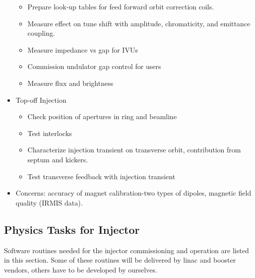 \documentclass[letterpaper,showtrims]{memoir}
\begin{document}
\begin{itemize}
\begin{itemize}
  \item Prepare look-up tables for feed forward orbit correction coils.
  \item Measure effect on tune shift with amplitude, chromaticity, and emittance coupling.
  \item Measure impedance vs gap for IVUs
  \item Commission undulator gap control for users
  \item Measure flux and brightness
  \end{itemize}
\item Top-off Injection
  \begin{itemize}%
  \item Check position of apertures in ring and beamline
  \item Test interlocks
  \item Characterize injection transient on transverse orbit, contribution from septum and kickers.
  \item Test transverse feedback with injection transient
  \end{itemize}
\item Concerns: accuracy of magnet calibration-two types of dipoles, magnetic field quality (IRMIS data).
\end{itemize}


\subsection{Physics Tasks for Injector}

Software routines needed for the injector commissioning and operation are
listed in this section. Some of these routines will be delivered by linac
and booster vendors, others have to be developed by ourselves.
\end{document}
